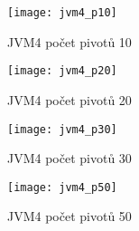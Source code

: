 \begin{figure}[h]
\centering
\texttt{[image: jvm4\_p10]}
\caption{JVM4 počet pivotů 10}
\label{fig:jvm4p10}
\end{figure}
\begin{figure}[h]
\centering
\texttt{[image: jvm4\_p20]}
\caption{JVM4 počet pivotů 20}
\label{fig:jvm4p20}
\end{figure}

\begin{figure}[h]
\centering
\texttt{[image: jvm4\_p30]}
\caption{JVM4 počet pivotů 30}
\label{fig:jvm4p30}
\end{figure}
\begin{figure}[h]
\centering
\texttt{[image: jvm4\_p50]}
\caption{JVM4 počet pivotů 50}
\label{fig:jvm4p50}
\end{figure}
